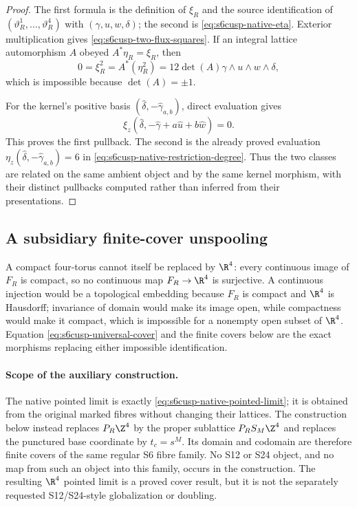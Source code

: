 \begin{proof}
The first formula is the definition of \(\xi_R\) and the source
identification of \((\vartheta_R^1,\ldots,\vartheta_R^4)\) with
\((\gamma,u,w,\delta)\); the second is
\eqref{eq:s6cusp-native-eta}.  Exterior multiplication gives
\eqref{eq:s6cusp-two-flux-squares}.  If an integral lattice automorphism
\(A\) obeyed \(A^*\eta_R=\xi_R\), then
\[
 0=\xi_R^2=A^*(\eta_R^2)
 =12\det(A)\gamma\wedge u\wedge w\wedge\delta,
\]
which is impossible because \(\det(A)=\pm1\).

For the kernel's positive basis
\((\widehat\delta,-\widehat\gamma_{a,b})\), direct evaluation gives
\[
 \xi_z(\widehat\delta,-\widehat\gamma
 +a\widehat u+b\widehat w)=0.
\]
This proves the first pullback.  The second is the already proved evaluation
\(\eta_z(\widehat\delta,-\widehat\gamma_{a,b})=6\) in
\eqref{eq:s6cusp-native-restriction-degree}.  Thus the two classes are
related on the same ambient object and by the same kernel morphism, with
their distinct pullbacks computed rather than inferred from their
presentations.
\end{proof}

\subsection{A subsidiary finite-cover unspooling}

A compact four-torus cannot itself be replaced by \(\R^4\): every
continuous image of \(F_R\) is compact, so no continuous map
\(F_R\to\R^4\) is surjective.  A continuous injection would be a topological
embedding because \(F_R\) is compact and \(\R^4\) is Hausdorff; invariance
of domain would make its image open, while compactness would make it
compact, which is impossible for a nonempty open subset of \(\R^4\).
Equation \eqref{eq:s6cusp-universal-cover} and the finite covers below are
the exact morphisms replacing either impossible identification.

\paragraph{Scope of the auxiliary construction.}
The native pointed limit is exactly
\eqref{eq:s6cusp-native-pointed-limit}; it is obtained from the original
marked fibres without changing their lattices.  The construction below
instead replaces \(P_R\Z^4\) by the proper sublattice
\(P_RS_M\Z^4\) and replaces the punctured base coordinate by
\(t_c=s^M\).  Its domain and codomain are therefore finite covers of the
same regular S6 fibre family.  No S12 or S24 object, and no map from such an
object into this family, occurs in the construction.  The resulting
\(\R^4\) pointed limit is a proved cover result, but it is not the separately
requested S12/S24-style globalization or doubling.

